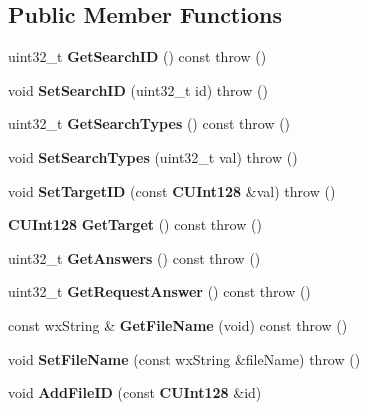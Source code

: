 \subsection*{Public Member Functions}
\begin{DoxyCompactItemize}
\item 
uint32\_\-t {\bfseries GetSearchID} () const   throw ()\label{classKademlia_1_1CSearch_a2999d6776fecb99589f1ad936df49eb2}

\item 
void {\bfseries SetSearchID} (uint32\_\-t id)  throw ()\label{classKademlia_1_1CSearch_ac947d2a41d649cf3b3cecbed2a997846}

\item 
uint32\_\-t {\bfseries GetSearchTypes} () const   throw ()\label{classKademlia_1_1CSearch_a7c06f5a08596c060575840abe48f6821}

\item 
void {\bfseries SetSearchTypes} (uint32\_\-t val)  throw ()\label{classKademlia_1_1CSearch_aeaf565e1de338668fc2f5092493e4592}

\item 
void {\bfseries SetTargetID} (const {\bf CUInt128} \&val)  throw ()\label{classKademlia_1_1CSearch_aa1e2c10762cf6ead6f90d71eea4614a0}

\item 
{\bf CUInt128} {\bfseries GetTarget} () const   throw ()\label{classKademlia_1_1CSearch_abb9c583c1c252e2025ae5b0f18f0bdca}

\item 
uint32\_\-t {\bfseries GetAnswers} () const   throw ()\label{classKademlia_1_1CSearch_ac475357f4fee3e9d08d7777f8226c7ad}

\item 
uint32\_\-t {\bfseries GetRequestAnswer} () const   throw ()\label{classKademlia_1_1CSearch_a1e18a09231c5aaa07ba183680f2a6c80}

\item 
const wxString \& {\bfseries GetFileName} (void) const   throw ()\label{classKademlia_1_1CSearch_a79ce9644b3cc03cec65a02cbfec3a9be}

\item 
void {\bfseries SetFileName} (const wxString \&fileName)  throw ()\label{classKademlia_1_1CSearch_abacb0ccee5f953129a7a74583ece8e17}

\item 
void {\bfseries AddFileID} (const {\bf CUInt128} \&id)\label{classKademlia_1_1CSearch_a6f778f51aa23a58d81a6ae9282fbb793}


\end{DoxyCompactItemize}
